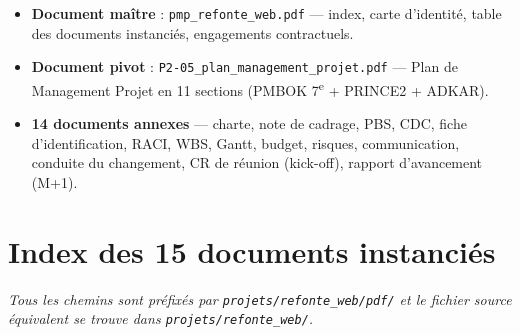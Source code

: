 \documentclass[11pt,a4paper,oneside]{report}
\begin{document}
\begin{itemize}
  \item \textbf{Document maître} : \texttt{pmp\_refonte\_web.pdf} --- index, carte d'identité, table des documents instanciés, engagements contractuels.
  \item \textbf{Document pivot} : \texttt{P2-05\_plan\_management\_projet.pdf} --- Plan de Management Projet en 11 sections (PMBOK 7\textsuperscript{e} + PRINCE2 + ADKAR).
  \item \textbf{14 documents annexes} --- charte, note de cadrage, PBS, CDC, fiche d'identification, RACI, WBS, Gantt, budget, risques, communication, conduite du changement, CR de réunion (kick-off), rapport d'avancement (M+1).
\end{itemize}

\section{Index des 15 documents instanciés}

\noindent\textit{Tous les chemins sont préfixés par \texttt{projets/refonte\_web/pdf/} et le fichier source équivalent se trouve dans \texttt{projets/refonte\_web/}.}

\vspace{4pt}
\end{document}

